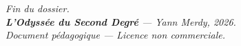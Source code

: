 \documentclass[11pt,a4paper]{article}
\begin{document}
\vfill

\begin{center}
\textcolor{slate}{\small\itshape Fin du dossier.\\[2pt]
\textbf{L'Odyssée du Second Degré} — Yann Merdy, 2026.\\[2pt]
Document pédagogique — Licence non commerciale.}
\end{center}
\end{document}
